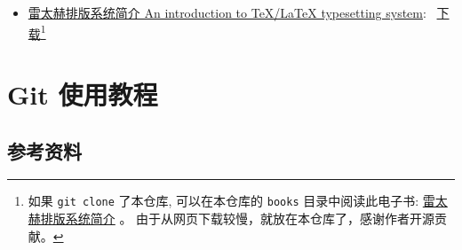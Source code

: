 \documentclass[
    11pt,
    base=hide,
    cite=authoryear,
    device=phone,
    lang=cn,
    mode=simple,
    result=answer,
    toc=onecol,
]{elegantbook_sierxue}
\begin{document}
\begin{itemize}
\begin{itemize}
                \href{https://www.ctan.org/tex-archive/info/lshort/chinese}
                {一份简短的 LaTeX 数学指南}：
                \href{https://wenda.latexstudio.net/article-5006.html}
                {中文下载}\footnote{
                    如果 \lstinline{git clone} 了本仓库,
                    可以在本仓库的 \lstinline{books}
                    目录中阅读此电子书:
                    \href{books/short-math-guide_cn.pdf}
                    {一份简短的 LaTeX 数学指南} 。
                    由于从网页下载较慢，就放在本仓库了，感谢作者开源贡献。
                    }
                ，
                \href{http://mirrors.ustc.edu.cn/CTAN/info/short-math-guide/short-math-guide.pdf}
                {英文下载}\footnote{
                    如果 \lstinline{git clone} 了本仓库,
                    可以在本仓库的 \lstinline{books}
                    目录中阅读此电子书:
                    \href{books/short-math-guide.pdf}
                    {Short Math Guide for \LaTeX{}} 。
                    由于从网页下载较慢，就放在本仓库了，感谢作者开源贡献。
                    }
            \item \href{https://github.com/huangxg/lnotes}
                {雷太赫排版系统简介 An introduction to TeX/LaTeX typesetting system}:~%
                    \href{https://github.com/huangxg/lnotes/raw/master/lnotes2.pdf}
                    {下载}\footnote{
                        如果 \lstinline{git clone} 了本仓库,
                        可以在本仓库的 \lstinline{books}
                        目录中阅读此电子书:
                        \href{books/lnotes2.pdf}{雷太赫排版系统简介} 。
                        由于从网页下载较慢，就放在本仓库了，感谢作者开源贡献。
                        }
        \end{itemize}
\end{itemize}




\chapter{Git 使用教程}%
\label{cha:git-tips}

\section{参考资料}%
\label{sec:git-refs}
\end{document}
